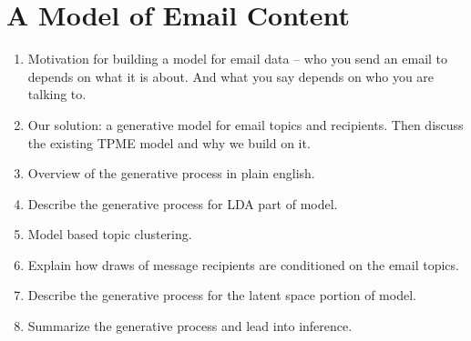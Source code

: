 \documentclass[fleqn]{MJDArticle}
\begin{document}
	
	
	
%
	


\section{A Model of Email Content}
\begin{enumerate}
	\item Motivation for building a model for email data -- who you send an email to depends on what it is about. And what you say depends on who you are talking to. 
	\item Our solution: a generative model for email topics and recipients. Then discuss the existing TPME model and why we build on it. 
	\item Overview of the generative process in plain english.
	\item Describe the generative process for LDA part of model.
	\item Model based topic clustering.
	\item Explain how draws of message recipients are conditioned on the email topics. 
	\item Describe the generative process for the latent space portion of model.
	\item Summarize the generative process and lead into inference. 
\end{enumerate}
\end{document}

